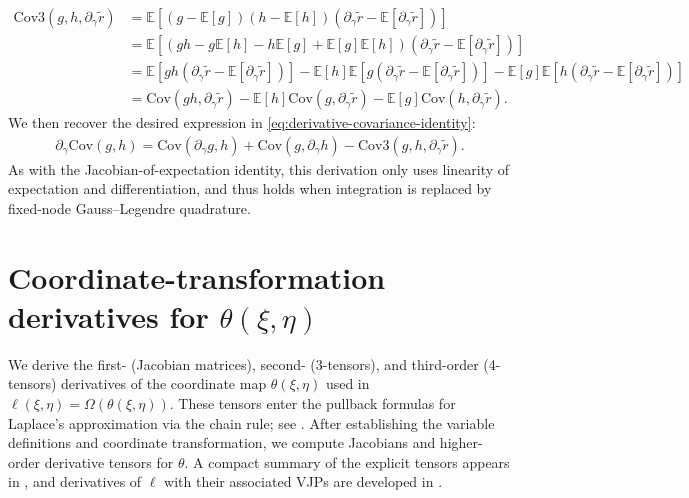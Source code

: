 \documentclass{article}
\begin{document}
\begin{align}
  \mathrm{Cov3}(g, h, \partial_{\gamma} \tilde{r}) & = \mathbb{E}[(g-\mathbb{E}[g])(h-\mathbb{E}[h])(\partial_{\gamma} \tilde{r}-\mathbb{E}[\partial_{\gamma} \tilde{r}])]                                                                                                                                                                           \\
                                                   & = \mathbb{E}[(gh - g\mathbb{E}[h] - h\mathbb{E}[g] + \mathbb{E}[g]\mathbb{E}[h])(\partial_{\gamma} \tilde{r} - \mathbb{E}[\partial_{\gamma} \tilde{r}])]                                                                                                                                        \\
                                                   & = \mathbb{E}[gh(\partial_{\gamma} \tilde{r} - \mathbb{E}[\partial_{\gamma} \tilde{r}])] - \mathbb{E}[h]\mathbb{E}[g(\partial_{\gamma} \tilde{r} - \mathbb{E}[\partial_{\gamma} \tilde{r}])] - \mathbb{E}[g]\mathbb{E}[h(\partial_{\gamma} \tilde{r} - \mathbb{E}[\partial_{\gamma} \tilde{r}])] \\
                                                   & = \mathrm{Cov}(gh, \partial_{\gamma} \tilde{r}) - \mathbb{E}[h]\mathrm{Cov}(g, \partial_{\gamma} \tilde{r}) - \mathbb{E}[g]\mathrm{Cov}(h, \partial_{\gamma} \tilde{r}).
\end{align}
%
We then recover the desired expression in \cref{eq:derivative-covariance-identity}:
%
\begin{align}
  \partial_{\gamma} \mathrm{Cov}(g, h) = \mathrm{Cov}(\partial_{\gamma} g, h) + \mathrm{Cov}(g, \partial_{\gamma} h) - \mathrm{Cov3}(g, h, \partial_{\gamma} \tilde{r}).
\end{align}
%
As with the Jacobian-of-expectation identity, this derivation only uses linearity of expectation and differentiation, and thus holds when integration is replaced by fixed-node Gauss--Legendre quadrature.

\section{Coordinate-transformation derivatives for $\theta(\xi,\eta)$}\label{app:theta-derivatives}

We derive the first- (Jacobian matrices), second- (3-tensors), and third-order (4-tensors) derivatives of the coordinate map $\theta(\xi,\eta)$ used in $\ell(\xi,\eta) = \Omega(\theta(\xi,\eta))$.
These tensors enter the pullback formulas for Laplace's approximation via the chain rule; see .
After establishing the variable definitions and coordinate transformation, we compute Jacobians and higher-order derivative tensors for $\theta$.
A compact summary of the explicit tensors appears in , and derivatives of $\ell$ with their associated VJPs are developed in .
\end{document}
